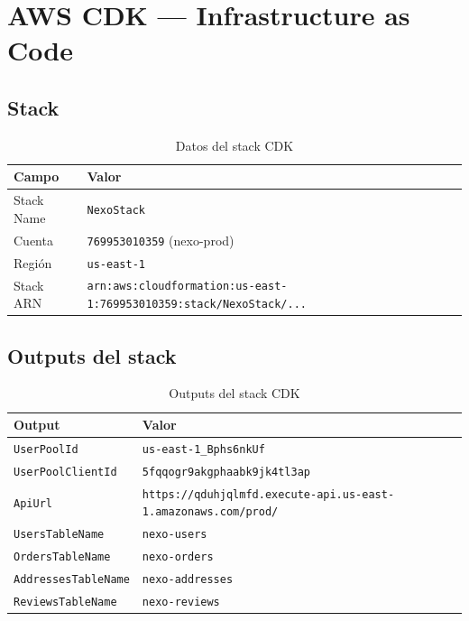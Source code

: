 \documentclass[12pt,a4paper]{article}
\begin{document}
\section{AWS CDK --- Infrastructure as Code}

\subsection{Stack}

\begin{table}[H]
\centering
\begin{tabular}{@{}ll@{}}
\toprule
\textbf{Campo} & \textbf{Valor} \\
\midrule
Stack Name & \texttt{NexoStack} \\
Cuenta & \texttt{769953010359} (nexo-prod) \\
Región & \texttt{us-east-1} \\
Stack ARN & \texttt{arn:aws:cloudformation:us-east-1:769953010359:stack/NexoStack/...} \\
\bottomrule
\end{tabular}
\caption{Datos del stack CDK}
\end{table}

\subsection{Outputs del stack}

\begin{table}[H]
\centering
\begin{tabular}{@{}ll@{}}
\toprule
\textbf{Output} & \textbf{Valor} \\
\midrule
\texttt{UserPoolId} & \texttt{us-east-1\_Bphs6nkUf} \\
\texttt{UserPoolClientId} & \texttt{5fqqogr9akgphaabk9jk4tl3ap} \\
\texttt{ApiUrl} & \texttt{https://qduhjqlmfd.execute-api.us-east-1.amazonaws.com/prod/} \\
\texttt{UsersTableName} & \texttt{nexo-users} \\
\texttt{OrdersTableName} & \texttt{nexo-orders} \\
\texttt{AddressesTableName} & \texttt{nexo-addresses} \\
\texttt{ReviewsTableName} & \texttt{nexo-reviews} \\
\bottomrule
\end{tabular}
\caption{Outputs del stack CDK}
\end{table}
\end{document}
